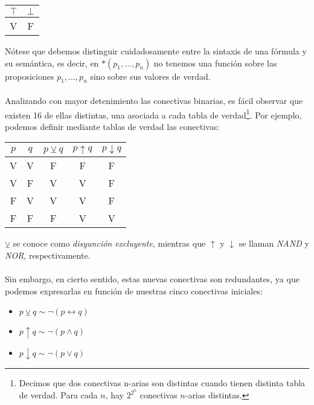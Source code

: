 \begin{table}[H]
\begin{center}
\begin{tabular}{|c|c|}
\hline 
$\top$ & $\bot$\\
\hline \hline
V & F\\ \hline
\end{tabular}
\end{center}
\end{table}
\noindent Nótese que debemos distinguir cuidadosamente entre la sintaxis de una fórmula y su semántica, es decir, en $*(p_1, ..., p_n)$ no tenemos una función sobre las proposiciones $p_1, ..., p_n$ sino sobre sus valores de verdad. \\ \\
Analizando con mayor detenimiento las conectivas binarias, es fácil observar que existen 16 de ellas distintas, una asociada a cada tabla de verdad\footnote{Decimos que dos conectivas n-arias son distintas cuando tienen distinta tabla de verdad. Para cada $n$, hay $2^{2^n}$ conectivas $n$-arias distintas.}. Por ejemplo, podemos definir mediante tablas de verdad las conectivas:

\begin{table}[htbp]
\begin{center}
\begin{tabular}{|c|c|c|c|c|}
\hline
$p$ & $q$ & $p \veebar q$ & $p\uparrow q$ & $p\downarrow q$\\
\hline \hline
V & V & F & F & F\\ \hline
V & F & V & V & F\\ \hline
F & V & V & V & F\\ \hline
F & F & F & V & V\\ \hline
\end{tabular}
\end{center}
\end{table}
\noindent $\veebar$ se conoce como \textit{disyunción excluyente}, mientras que $\uparrow$ y $\downarrow$ se llaman \textit{NAND} y \textit{NOR}, respectivamente.  \\ \\
Sin embargo, en cierto sentido, estas nuevas conectivas son redundantes, ya que podemos expresarlas en función de nuestras cinco conectivas iniciales:
\begin{itemize}
    \item $p\veebar q \sim \neg(p\leftrightarrow q) $
    \item $p\uparrow q \sim \neg(p\land q) $
    \item $p\downarrow q \sim \neg(p\lor q) $
\end{itemize}

